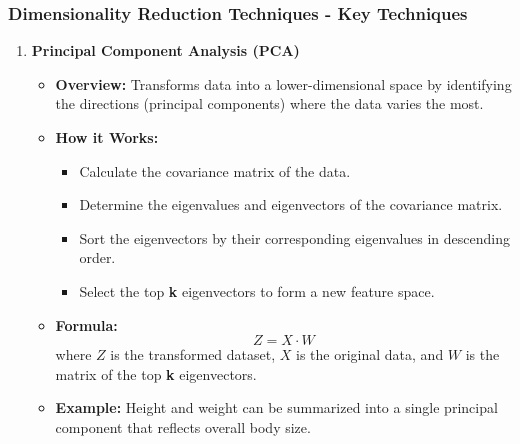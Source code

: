 \documentclass[aspectratio=169]{beamer}
\begin{document}
\begin{frame}[fragile]
    \frametitle{Dimensionality Reduction Techniques - Key Techniques}
    \begin{enumerate}
        \item \textbf{Principal Component Analysis (PCA)}
        \begin{itemize}
            \item \textbf{Overview:} Transforms data into a lower-dimensional space by identifying the directions (principal components) where the data varies the most.
            \item \textbf{How it Works:}
            \begin{itemize}
                \item Calculate the covariance matrix of the data.
                \item Determine the eigenvalues and eigenvectors of the covariance matrix.
                \item Sort the eigenvectors by their corresponding eigenvalues in descending order.
                \item Select the top \textbf{k} eigenvectors to form a new feature space.
            \end{itemize}
            \item \textbf{Formula:}
            \begin{equation}
                Z = X \cdot W
            \end{equation}
            where \( Z \) is the transformed dataset, \( X \) is the original data, and \( W \) is the matrix of the top \textbf{k} eigenvectors.
            
            \item \textbf{Example:} Height and weight can be summarized into a single principal component that reflects overall body size.
        \end{itemize}
    \end{enumerate}
\end{frame}
\end{document}
